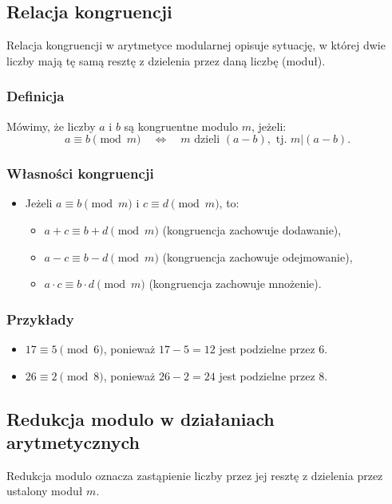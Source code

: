 \subsection{Relacja kongruencji}
Relacja kongruencji w arytmetyce modularnej opisuje sytuację, w której dwie liczby mają tę samą resztę z dzielenia przez daną liczbę (moduł).

\subsubsection{Definicja}
Mówimy, że liczby \( a \) i \( b \) są kongruentne modulo \( m \), jeżeli:
\[
a \equiv b \pmod{m} \quad \Leftrightarrow \quad m \text{ dzieli } (a - b), \text{ tj. } m | (a - b).
\]

\subsubsection{Własności kongruencji}
\begin{itemize}
    \item Jeżeli \( a \equiv b \pmod{m} \) i \( c \equiv d \pmod{m} \), to:
    \begin{itemize}
        \item \( a + c \equiv b + d \pmod{m} \) (kongruencja zachowuje dodawanie),
        \item \( a - c \equiv b - d \pmod{m} \) (kongruencja zachowuje odejmowanie),
        \item \( a \cdot c \equiv b \cdot d \pmod{m} \) (kongruencja zachowuje mnożenie).
    \end{itemize}
\end{itemize}

\subsubsection{Przykłady}
\begin{itemize}
    \item \( 17 \equiv 5 \pmod{6} \), ponieważ \( 17 - 5 = 12 \) jest podzielne przez \( 6 \).
    \item \( 26 \equiv 2 \pmod{8} \), ponieważ \( 26 - 2 = 24 \) jest podzielne przez \( 8 \).
\end{itemize}

\subsection{Redukcja modulo w działaniach arytmetycznych}
Redukcja modulo oznacza zastąpienie liczby przez jej resztę z dzielenia przez ustalony moduł \( m \).

